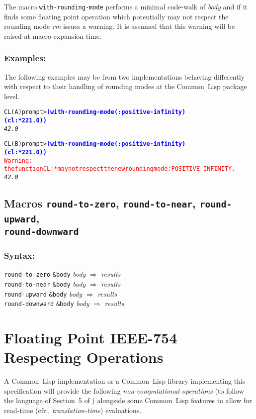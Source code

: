 \documentclass[10pt,fleqn]{article}
\newcommand{\CL}{\textsf{Common~Lisp}}
\newcommand{\code}[1]{\texttt{#1}}
\newcommand{\varname}[1]{\textit{#1}}
\newcommand{\codeprompt}[1]{\textcolor{blue}{\textbf{#1}}}
\newcommand{\IEEEFPStd}{IEEE-754}
\newcommand{\DDictionaryItem}[1]{\vspace*{6pt}\noindent\hrulefill\vspace*{-9pt}\subsection*{#1}}
\newcommand{\DSyntax}{\subsubsection*{Syntax:}}
\newcommand{\DExamples}{\subsubsection*{Examples:}}
\begin{document}
The macro \code{with-rounding-mode} performs a minimal code-walk of
\varname{body} and if it finds some floating point operation which
potentially may not respect the rounding mode \varname{rm} issues a
warning.
%
It is assumed that this warning will be raised at macro-expansion
time.

\DExamples{}

The following examples may be from two implementations behaving
differently with respect to their handling of rounding modes at the
\CL{} package level.

\begin{alltt}
CL(A) prompt> \codeprompt{(with-rounding-mode (:positive-infinity)
                  (cl:* 2 21.0))}
\textit{42.0}
\end{alltt}

\begin{alltt}
CL(B) prompt> \codeprompt{(with-rounding-mode (:positive-infinity)
                  (cl:* 2 21.0))}
\textcolor{red}{Warning:
the function CL:* may not respect the new rounding mode :POSITIVE-INFINITY.}
\textit{42.0}
\end{alltt}

\DDictionaryItem{Macros \code{round-to-zero}, \code{round-to-near},
  \code{round-upward},\\
  \code{round-downward}}

\DSyntax{}

\code{round-to-zero} \code{\&body} \varname{body}
$\Rightarrow$ \varname{results}\\
\code{round-to-near} \code{\&body} \varname{body}
$\Rightarrow$ \varname{results}\\
\code{round-upward} \code{\&body} \varname{body}
$\Rightarrow$ \varname{results}\\
\code{round-downward} \code{\&body} \varname{body}
$\Rightarrow$ \varname{results}



\section{Floating Point \IEEEFPStd{} Respecting Operations}
\label{sect:fp-operations}

A \CL{} implementation or a \CL{} library implementing this
specification will provide the following \emph{non-computational
  operations} (to follow the language of Section~5 of \cite{2008:IEEE-754})
alongside some \CL{} features to allow for read-time (cfr.,
\emph{translation-time}) evaluations.
\end{document}
